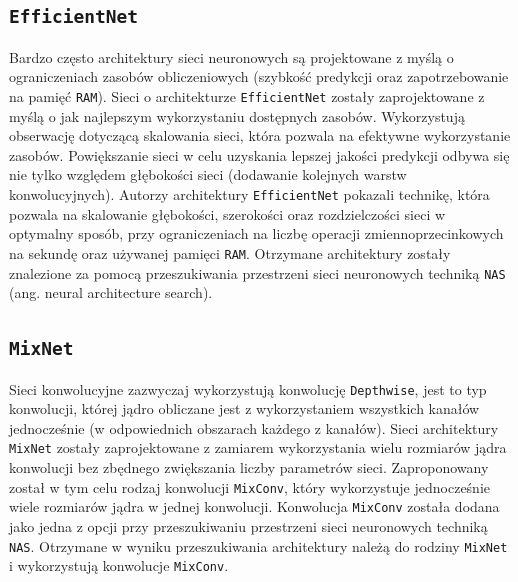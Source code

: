 \subsection{\texttt{EfficientNet}}
Bardzo często architektury sieci neuronowych są projektowane z myślą o ograniczeniach zasobów obliczeniowych (szybkość predykcji oraz zapotrzebowanie na pamięć \texttt{RAM}). Sieci o architekturze \texttt{EfficientNet} \cite{1905.11946} zostały zaprojektowane z myślą o jak najlepszym wykorzystaniu dostępnych zasobów. Wykorzystują obserwację dotyczącą skalowania sieci, która pozwala na efektywne wykorzystanie zasobów. Powiększanie sieci w celu uzyskania lepszej jakości predykcji odbywa się nie tylko względem głębokości sieci (dodawanie kolejnych warstw konwolucyjnych). Autorzy architektury \texttt{EfficientNet} pokazali technikę, która pozwala na skalowanie głębokości, szerokości oraz rozdzielczości sieci w optymalny sposób, przy ograniczeniach na liczbę operacji zmiennoprzecinkowych na sekundę oraz używanej pamięci \texttt{RAM}. Otrzymane architektury zostały znalezione za pomocą przeszukiwania przestrzeni sieci neuronowych techniką \texttt{NAS} (ang. neural architecture search).

\subsection{\texttt{MixNet}}
Sieci konwolucyjne zazwyczaj wykorzystują konwolucję \texttt{Depthwise}, jest to typ konwolucji, której jądro obliczane jest z wykorzystaniem wszystkich kanałów jednocześnie (w odpowiednich obszarach każdego z kanałów). Sieci architektury \texttt{MixNet} \cite{1907.09595} zostały zaprojektowane z zamiarem wykorzystania wielu rozmiarów jądra konwolucji bez zbędnego zwiększania liczby parametrów sieci. Zaproponowany został w tym celu rodzaj konwolucji \texttt{MixConv}, który wykorzystuje jednocześnie wiele rozmiarów jądra w jednej konwolucji. Konwolucja \texttt{MixConv} została dodana jako jedna z opcji przy przeszukiwaniu przestrzeni sieci neuronowych techniką \texttt{NAS}. Otrzymane w wyniku przeszukiwania architektury należą do rodziny \texttt{MixNet} i wykorzystują konwolucje \texttt{MixConv}.

